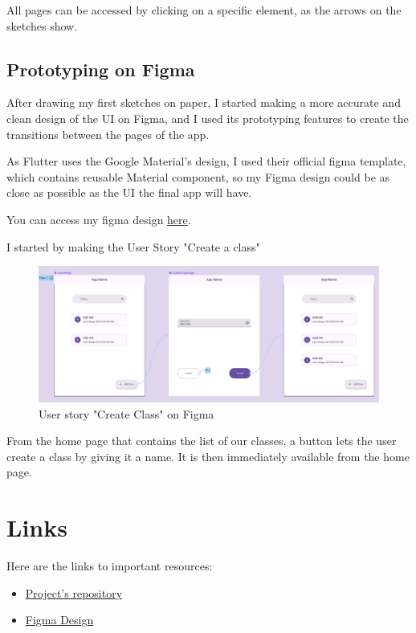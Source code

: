 \documentclass[]{article}
\begin{document}
	All pages can be accessed by clicking on a specific element, as the arrows on the sketches show.
	
	\pagebreak
	
	\subsection{Prototyping on Figma}
	
	After drawing my first sketches on paper, I started making a more accurate and clean design of the UI on Figma, and I used its prototyping features to create the transitions between the pages of the app.
	
	As Flutter uses the Google Material's design, I used their official figma template, which contains reusable Material component, so my Figma design could be as close as possible as the UI the final app will have.
	
	You can access my figma design \href{https://www.figma.com/file/ZOlxVGHb9fLdk5uUODqMU9/CSCI-337---Notes-Taking-App?type=design&node-id=54810%3A34721&mode=design&t=fS6KJvRgsvtgz9cf-1}{here}.
	
	I started by making the User Story "Create a class"
	
		\begin{figure}[!htb]
		\centering
		\includegraphics[scale=0.3]{figma_user_story_create_class}
		\caption{User story "Create Class" on Figma}
	\end{figure}
	
	From the home page that contains the list of our classes, a button lets the user create a class by giving it a name. It is then immediately available from the home page.
	
	\section{Links}
	
	Here are the links to important resources:
	
	\begin{itemize}
		\item \href{https://github.com/Logan-Developer/ui-lahumbert/tree/main/FinalProject}{Project's repository} 
		
		\item \href{https://www.figma.com/file/ZOlxVGHb9fLdk5uUODqMU9/CSCI-337---Notes-Taking-App?type=design&node-id=54810%3A34721&mode=design&t=fS6KJvRgsvtgz9cf-1}{Figma Design}
	\end{itemize}
	
	\label{LastPage}
\end{document}
